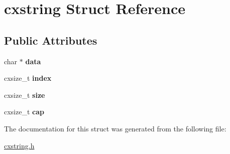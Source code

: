 \hypertarget{a00072}{}\section{cxstring Struct Reference}
\label{a00072}
\subsection*{Public Attributes}
\begin{DoxyCompactItemize}
\item 
\mbox{\label{a00072_adbb4c5b19ff3e49e2da0776d1102da02}} 
char $\ast$ {\bfseries data}
\item 
\mbox{\label{a00072_a8ee64de5ade5635f6609c8fd26a3d7ee}} 
cxsize\+\_\+t {\bfseries index}
\item 
\mbox{\label{a00072_a98ef2ad0212a946095e90ed9fe16a2d6}} 
cxsize\+\_\+t {\bfseries size}
\item 
\mbox{\label{a00072_a38495c5af12925f89ad3a57c06d8fabe}} 
cxsize\+\_\+t {\bfseries cap}
\end{DoxyCompactItemize}


The documentation for this struct was generated from the following file\+:\begin{DoxyCompactItemize}
\item 
\hyperlink{a00026}{cxstring.\+h}\end{DoxyCompactItemize}
